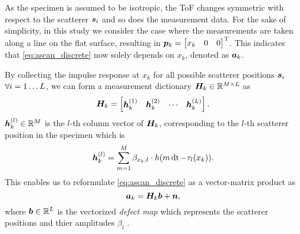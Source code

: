 As the specimen is assumed to be isotropic, the ToF changes symmetric with respect to the scatterer $\bm{s}_{i}$ and so does the measurement data. For the sake of simplicity, in this study we consider the case where the measurements are taken along a line on the flat surface, resulting in $\bm{p}_{k} = \begin{bmatrix} x_k & 0 & 0 \end{bmatrix}^{\operatorname{T}}$. This indicates that \eqref{eq:ascan_discrete} now solely depends on $x_k$, denoted as $\bm{a}_{k}$. \par

By collecting the impulse response at $x_k$ for all possible scatterer positions $\bm{s}_{i}$ $\forall i = 1 \ldots L$, we can form a measurement dictionary $\bm{H}_{k} \in {\mathbb{R}}^{M \times L} $ as
\begin{equation} \label{eq:SAFTk_def}
	\SAFT_k = 
	\begin{bmatrix} \SAFTcol{k}{1} & \SAFTcol{k}{2} & \cdots & \SAFTcol{k}{\LL} \end{bmatrix}.
\end{equation}
$\bm{h}_{k}^{(l)} \in {\mathbb{R}}^{M}$ is the $l$-th column vector of $\bm{H}_{k}$, corresponding to the $l$-th scatterer position in the specimen which is
\begin{equation} \label{eq:SAFTcol}
	\SAFTcol{k}{l} = \sum_{m = 1}^{\M} \refcoeff_{x_{k}, l} \cdot \pulsesig (m \dt - \tau_{l} (x_{k}) ).
\end{equation} 
This enables us to reformulate \eqref{eq:ascan_discrete} as a vector-matrix product as
\begin{equation} \label{eq:FWM_single}
	\ascan{k} = \SAFT_k \defect + \noisevec,
\end{equation}
where $\bm{b} \in {\mathbb{R}}^{L}$ is the vectorized \textit{defect map} which represents the scatterer positions and thier amplitudes $\beta_{l}$ \cite{Kirchhof16IUS}. \par

